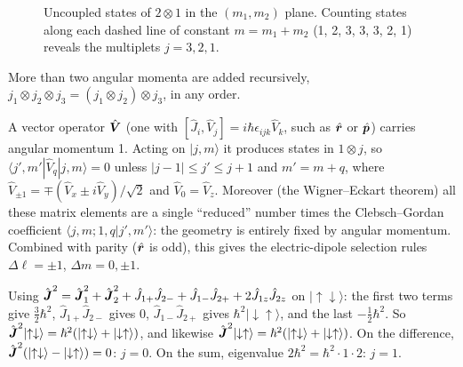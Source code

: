 \begin{figure}[ht]
\centering
{}
\caption{Uncoupled states of $2\otimes1$ in the $(m_1,m_2)$ plane. Counting states along each dashed line of constant $m = m_1+m_2$ (1, 2, 3, 3, 3, 2, 1) reveals the multiplets $j = 3, 2, 1$.}
\end{figure}

More than two angular momenta are added recursively, $j_1\otimes j_2\otimes j_3 = (j_1\otimes j_2)\otimes j_3$, in any order.

\begin{fact}
A vector operator $\hat{\vect{V}}$ (one with $[\hat{J}_i,\hat{V}_j] = i\hbar\epsilon_{ijk}\hat{V}_k$, such as $\hat{\bm{r}}$ or $\hat{\bm{p}}$) carries angular momentum 1. Acting on $|j,m\rangle$ it produces states in $1\otimes j$, so $\langle j',m'|\hat{V}_q|j,m\rangle = 0$ unless $|j-1|\le j'\le j+1$ and $m' = m+q$, where $\hat{V}_{\pm1} = \mp(\hat{V}_x\pm i\hat{V}_y)/\sqrt2$ and $\hat{V}_0 = \hat{V}_z$. Moreover (the Wigner--Eckart theorem) all these matrix elements are a single ``reduced'' number times the Clebsch--Gordan coefficient $\langle j,m;1,q|j',m'\rangle$: the geometry is entirely fixed by angular momentum. Combined with parity ($\hat{\bm{r}}$ is odd), this gives the electric-dipole selection rules $\Delta\ell = \pm1$, $\Delta m = 0,\pm1$.
\end{fact}

\begin{example}
Using $\hat{\vect{J}}^2 = \hat{\vect{J}}_1^2 + \hat{\vect{J}}_2^2 + \hat{J}_{1+}\hat{J}_{2-} + \hat{J}_{1-}\hat{J}_{2+} + 2\hat{J}_{1z}\hat{J}_{2z}$ on $|{\uparrow\downarrow}\rangle$: the first two terms give $\frac32\hbar^2$, $\hat{J}_{1+}\hat{J}_{2-}$ gives 0, $\hat{J}_{1-}\hat{J}_{2+}$ gives $\hbar^2|{\downarrow\uparrow}\rangle$, and the last $-\frac12\hbar^2$. So $\hat{\vect{J}}^2|{\uparrow\downarrow}\rangle = \hbar^2(|{\uparrow\downarrow}\rangle + |{\downarrow\uparrow}\rangle)$, and likewise $\hat{\vect{J}}^2|{\downarrow\uparrow}\rangle = \hbar^2(|{\uparrow\downarrow}\rangle + |{\downarrow\uparrow}\rangle)$. On the difference, $\hat{\vect{J}}^2(|{\uparrow\downarrow}\rangle - |{\downarrow\uparrow}\rangle) = 0$: $j = 0$. On the sum, eigenvalue $2\hbar^2 = \hbar^2\cdot1\cdot2$: $j = 1$.
\end{example}

